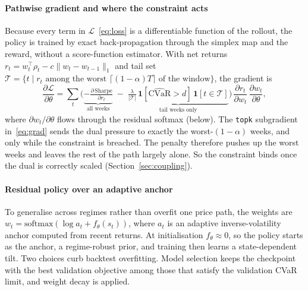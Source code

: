 \documentclass[sigconf]{acmart}
\begin{document}
\paragraph{Pathwise gradient and where the constraint acts} Because every term in
$\mathcal{L}$~\eqref{eq:loss} is a differentiable function of the rollout, the policy is trained
by exact back-propagation through the simplex map and the reward, without a
score-function estimator. With net returns $r_t = w_t^{\top}\rho_t - c\lVert w_t-w_{t-1}\rVert_1$
and tail set $\mathcal{T}=\{t \mid r_t \text{ among the worst } \lceil(1-\alpha)T\rceil
\text{ of the window}\}$, the gradient is
\begin{equation}\label{eq:grad}
\frac{\partial \mathcal{L}}{\partial \theta}
= \sum_{t}\Big(
  \underbrace{-\tfrac{\partial\,\mathrm{Sharpe}}{\partial r_t}}_{\text{all weeks}}
  \;-\;
  \underbrace{\tfrac{\lambda}{|\mathcal{T}|}\,
  \mathbf{1}[\widehat{\mathrm{CVaR}}>d]\,\mathbf{1}[t\in\mathcal{T}]}_{\text{tail weeks only}}
  \Big)\,\frac{\partial r_t}{\partial w_t}\,\frac{\partial w_t}{\partial \theta},
\end{equation}
where $\partial w_t/\partial\theta$ flows through the residual softmax
(below). The \texttt{topk} subgradient in~\eqref{eq:grad} sends the dual pressure to exactly the
worst-$(1-\alpha)$ weeks, and only while the constraint is breached. The penalty therefore
pushes up the worst weeks and leaves the rest of the path largely alone. So the constraint binds once the dual is correctly scaled (Section~\ref{sec:coupling}).

\paragraph{Residual policy over an adaptive anchor} To generalise across regimes
rather than overfit one price path, the weights are $w_t = \mathrm{softmax}(\log a_t +
f_\theta(s_t))$, where $a_t$ is an adaptive inverse-volatility anchor computed from
recent returns. At initialisation $f_\theta \approx 0$, so the policy starts as the anchor, a regime-robust prior, and training then learns a state-dependent tilt. Two choices curb backtest overfitting. Model selection keeps the checkpoint with the best validation
objective among those that satisfy the validation CVaR limit, and weight decay is applied.
\end{document}
